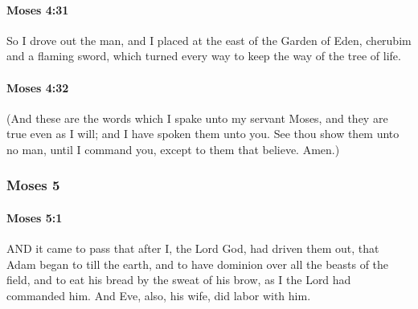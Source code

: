 		\paragraph{Moses 4:31} %
			\label{MOSES-4-31}

			So I drove out the man, and I placed at the east of the Garden of Eden, cherubim and a flaming sword, which turned every way to keep the way of the tree of life.


		\paragraph{Moses 4:32} %
			\label{MOSES-4-32}

			(And these are the words which I spake unto my servant Moses, and they are true even as I will; and I have spoken them unto you. See thou show them unto no man, until I command you, except to them that believe. Amen.)

		
	\subsubsection{Moses 5} %
		\label{MOSES-5}
		
		\paragraph{Moses 5:1} %
			\label{MOSES-5-1}

			AND it came to pass that after I, the Lord God, had driven them out, that Adam began to till the earth, and to have dominion over all the beasts of the field, and to eat his bread by the sweat of his brow, as I the Lord had commanded him. And Eve, also, his wife, did labor with him.


